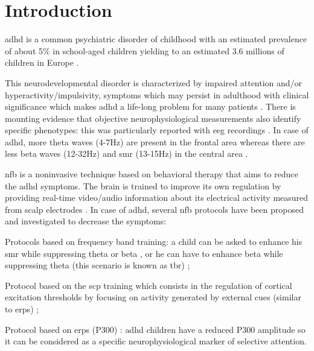 

\section{Introduction} 

\gls{adhd} is a common psychiatric disorder of childhood with an estimated prevalence of about 5\% in school-aged children yielding to an 
estimated 3.6 millions of children in Europe \citep{american2013}.

This neurodevelopmental disorder is characterized by impaired attention and/or hyperactivity/impulsivity, symptoms which may persist 
in adulthood with clinical significance which makes \gls{adhd} a life-long problem for many patients \citep{Faraone2006}. There is mounting evidence 
that objective neurophysiological  measurements also identify specific phenotypes: this was particularly reported with \gls{eeg} 
recordings \citep{loo2017}. In case of \gls{adhd}, more theta waves (4-7Hz) are present in the frontal area
 whereas there are less beta waves (12-32Hz) and \gls{smr} (13-15Hz) in the central area \citep{Monastra2005, Matouvsek1984,
 Janzen1995}. 

\gls{nfb} is a noninvasive technique based on behavioral therapy that aims to reduce the \gls{adhd} symptoms.
 The brain is trained to improve its own regulation by providing real-time video/audio information 
about its electrical activity measured from scalp electrodes \citep{Arns2015, Steffert2010}. In case of \gls{adhd}, several
 \gls{nfb} protocols have been proposed and investigated to decrease the symptoms: 
\begin{description}
	\item Protocols based on frequency band training: a child can be asked to enhance his \gls{smr} 
	while suppressing theta or beta \citep{Lubar1976}, or he can have to enhance beta
	while suppressing theta (this scenario is known as \gls{tbr}) \citep{Arns2013};
	\item Protocol based on the \gls{scp} training which consists in the regulation of cortical excitation 
	thresholds by focusing on activity generated by external cues 
	(similar to \gls{erps}) \citep{Heinrich2004, Banaschewski2007}; 
	\item Protocol based on \gls{erps} (P300) \citep{Fouillen2017}: \gls{adhd} children have a reduced P300 
	amplitude so it can be considered as a specific neurophysiological marker 
	of selective attention. 
\end{description} 

